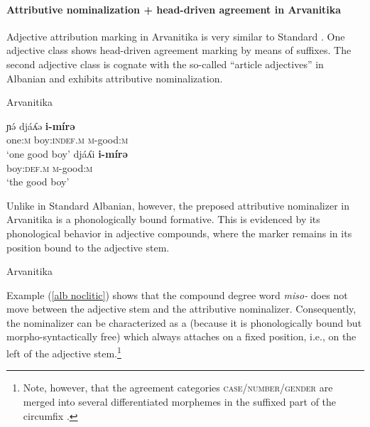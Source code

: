 \paragraph*{Attributive nominalization + head\hyp{}driven agreement in Arvanitika}
Adjective attribution marking in Arvanitika is very similar to Standard . One adjective class shows head\hyp{}driven agreement marking by means of suffixes. The second adjective class is cognate with the so-called “article adjectives” in Albanian and exhibits attributive nominalization. 
\begin{exe}
\ex \rm{Arvanitika \citep[303]{sasse1991}}
\begin{xlist}
\ex
\gll	ɲə́ 			djáʎə 			\textbf{i-mírə}\\
	one:\textsc{m} 	boy:\textsc{indef.m} 	\textsc{m}-good:\textsc{m}\\
\glt	‘one good boy’
\ex
\gll				djáʎi 				\textbf{i-mírə}\\
				boy:\textsc{def.m} 	\textsc{m}-good:\textsc{m}\\
\glt	‘the good boy’
\end{xlist}
\end{exe}
Unlike in Standard Albanian, however, the preposed attributive nominalizer in Arvanitika is a phonologically bound formative. This is evidenced by its phonological behavior in adjective compounds, where the marker remains in its position bound to the adjective stem.
\begin{exe}
\ex \rm{Arvanitika \citep[304]{sasse1991}}
\label{alb noclitic}
\begin{xlist}
\end{xlist}
\end{exe}
Example (\ref{alb noclitic}) shows that the compound degree word \textit{miso-} does not move between the adjective stem and the attributive nominalizer. Consequently, the nominalizer can be characterized as a  (because it is phonologically bound but morpho-syntactically free) which always attaches on a fixed position, i.e., on the left of the adjective stem.\footnote{Note, however, that the agreement categories \textsc{case/number/gender} are merged into several differentiated morphemes in the suffixed part of the circumfix \cite[124–128]{sasse1991}.}

